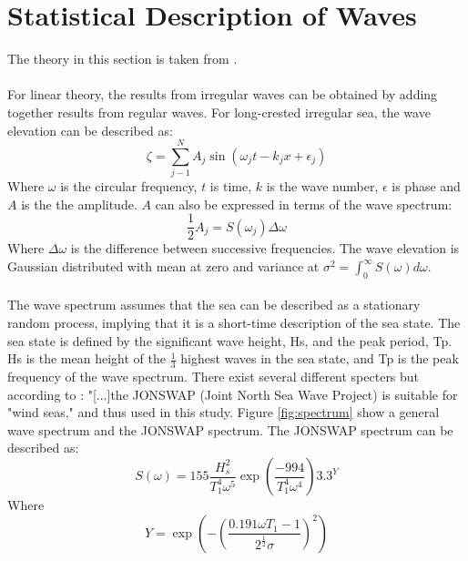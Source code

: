 \section{Statistical Description of Waves} 
 The theory in this section is taken from \cite{Faltinsen1990}.\\\\ For linear theory, the results from irregular waves can be obtained by adding together results from regular waves. For long-crested irregular sea, the wave elevation can be described as:
\begin{equation}
    \zeta = \sum_{j-1}^N A_j \sin(\omega_jt-k_jx+\epsilon_j)
    \label{eq:elevation}
\end{equation}
Where $\omega$ is the circular frequency, $t$ is time, $k$ is the wave number, $\epsilon$ is phase and $A$ is the the amplitude. $A$ can also be expressed in terms of the wave spectrum:
\begin{equation}
    \frac{1}{2}A_j=S(\omega_j) \Delta \omega
\end{equation}
Where $\Delta \omega$ is the difference between successive frequencies. The wave elevation is Gaussian distributed with mean at zero and variance at $\sigma^2= \int_0 ^ \infty S(\omega) d\omega $.\\\\ The wave spectrum assumes that the sea can be described as a stationary random process, implying that it is a short-time description of the sea state. The sea state is defined by the significant wave height, Hs, and the peak period, Tp. Hs is the mean height of the $\frac{1}{3}$ highest waves in the sea state, and Tp is the peak frequency of the wave spectrum. There exist several different specters but according to \cite{Lifes50+D1.1}: "[...]the JONSWAP (Joint North Sea Wave Project) is suitable for "wind seas," and thus used in this study. Figure \ref{fig:spectrum} show a general wave spectrum and the JONSWAP spectrum. The JONSWAP spectrum can be described as:
\begin{equation}
    S(\omega)=155 \frac{H_s^2}{T_1^4 \omega ^5} \exp{(\frac{-994}{T_1^4 \omega ^4})} 3.3^Y
\end{equation}
Where
\begin{equation}
    Y= \exp \left(-\left( \frac{0.191 \omega T_1 -1}{2^\frac{1}{2} \sigma} \right)^2\right)
\end{equation}

